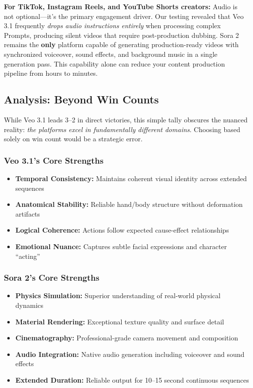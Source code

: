 \begin{resultbox}
\textbf{For TikTok, Instagram Reels, and YouTube Shorts creators:} Audio is not optional---it's the primary engagement driver. Our testing revealed that Veo 3.1 frequently \textit{drops audio instructions entirely} when processing complex Prompts, producing silent videos that require post-production dubbing. Sora 2 remains the \textbf{only} platform capable of generating production-ready videos with synchronized voiceover, sound effects, and background music in a single generation pass. This capability alone can reduce your content production pipeline from hours to minutes.
\end{resultbox}

\subsection{Analysis: Beyond Win Counts}

While Veo 3.1 leads 3--2 in direct victories, this simple tally obscures the nuanced reality: \textit{the platforms excel in fundamentally different domains}. Choosing based solely on win count would be a strategic error.

\subsubsection{Veo 3.1's Core Strengths}

\begin{itemize}
    \item \textbf{Temporal Consistency:} Maintains coherent visual identity across extended sequences
    \item \textbf{Anatomical Stability:} Reliable hand/body structure without deformation artifacts
    \item \textbf{Logical Coherence:} Actions follow expected cause-effect relationships
    \item \textbf{Emotional Nuance:} Captures subtle facial expressions and character ``acting''
\end{itemize}

\subsubsection{Sora 2's Core Strengths}

\begin{itemize}
    \item \textbf{Physics Simulation:} Superior understanding of real-world physical dynamics
    \item \textbf{Material Rendering:} Exceptional texture quality and surface detail
    \item \textbf{Cinematography:} Professional-grade camera movement and composition
    \item \textbf{Audio Integration:} Native audio generation including voiceover and sound effects
    \item \textbf{Extended Duration:} Reliable output for 10--15 second continuous sequences
\end{itemize}

